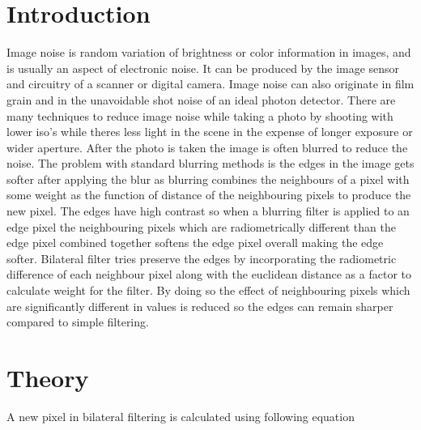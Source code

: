 \documentclass[a4paper, english]{article}
\begin{document}
\section{Introduction}
%
Image noise is random variation of brightness or color information in images, and is usually an aspect of electronic noise. It can be produced by the image sensor and circuitry of a scanner or digital camera. Image noise can also originate in film grain and in the unavoidable shot noise of an ideal photon detector.\cite{wiki:imagenoise} There are many techniques to reduce image noise while taking a photo by shooting with lower iso's while theres less light in the scene in the expense of longer exposure or wider aperture. After the photo is taken the image is often blurred to reduce the noise. The problem with standard blurring methods is the edges in the image gets softer after applying the blur as blurring combines the neighbours of a pixel with some weight as the function of distance of the neighbouring pixels to produce the new pixel. The edges have high contrast so when a blurring filter is applied to an edge pixel the neighbouring pixels which are radiometrically different than the edge pixel combined together softens the edge pixel overall making the edge softer. Bilateral filter tries preserve the edges by incorporating the radiometric difference of each neighbour pixel along with the euclidean distance as a factor to calculate weight for the filter. By doing so the effect of neighbouring pixels which are significantly different in values is reduced so the edges can remain sharper compared to simple filtering.

\section{Theory}
A new pixel in bilateral filtering is calculated using following equation\cite{wiki:bilateralfiltering}
\end{document}
